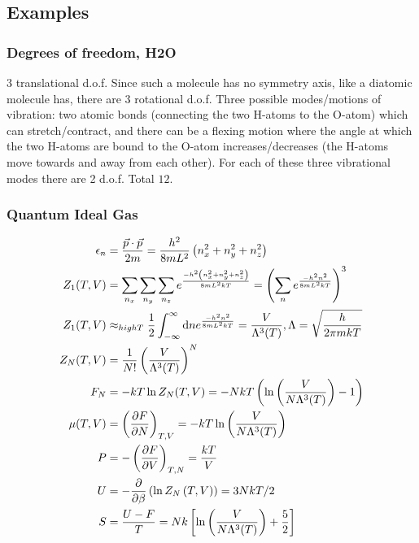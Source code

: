 \documentclass[a4paper, norsk, 8pt]{article}
\begin{document}
\begin{multicols*}{3}
\subsection*{\footnotesize  Examples}
\subsubsection*{\scriptsize Degrees of freedom, H2O}
3 translational d.o.f.
Since such a molecule has no symmetry axis, like a diatomic molecule has, there are 3 rotational d.o.f.
Three possible modes/motions of vibration: two atomic bonds (connecting
the two H-atoms to the O-atom) which can stretch/contract, and there can
be a flexing motion where the angle at which the two H-atoms are bound to
the O-atom increases/decreases (the H-atoms move towards and away from
each other). For each of these three vibrational modes there are 2 d.o.f. Total $12$.

\subsubsection*{\scriptsize Quantum Ideal Gas}
\begin{align*}
  \epsilon_n &= \frac{\vec{p}\cdot\vec{p}}{2m}  = \frac{h^2}{8mL^2}\left(n_x^2+n_y^2+n_z^2\right) \\
  Z_1(T,V) &= \sum_{n_x}\sum_{n_y}\sum_{n_z}e^{\frac{-h^2\left(n_x^2+n_y^2+n_z^2\right)}{8mL^2kT}} = \left( \sum_{n}e^{\frac{-h^2n^2}{8mL^2kT}} \right)^3 \\
  Z_1(T,V) &\approx_{high T} \frac{1}{2}\int_{-\infty}^{\infty}\mbox{d}n e^{\frac{-h^2n^2}{8mL^2kT}} = \frac{V}{\Lambda^3(T)}, \Lambda = \sqrt{\frac{h}{2\pi mkT}}\\
  Z_N(T,V) &= \frac{1}{N!}\left(\frac{V}{\Lambda^3(T)}\right)^N \\
  F_N &= -kT\ln{Z_N(T,V)} = -NkT\left( \ln{\left( \frac{V}{N\Lambda^3(T)}\right)} -1 \right)\\
  \mu(T,V) &= \left( \pdv{F}{N} \right)_{T,V} = -kT\ln{\left( \frac{V}{N\Lambda^3(T)} \right)} \\
  P &= -\left( \pdv{F}{V} \right)_{T,N} = \frac{kT}{V}\\
  U &= -\pdv{}{\beta}\left( \ln{Z_N\left(T, V\right)}\right) = 3NkT/2 \\
  S &= \frac{U-F}{T} = Nk\left[ \ln{\left( \frac{V}{N\Lambda^3(T)} \right)} + \frac{5}{2} \right]
\end{align*}

\end{multicols*}
\end{document}
